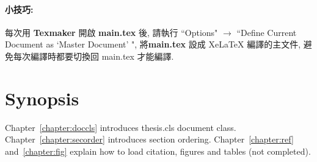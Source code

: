 \paragraph{小技巧:} 每次用 \textbf{Texmaker} 開啟 \textbf{main.tex} 後, 請執行 ``Options" $\rightarrow$ ``Define Current Document as `Master Document' ", 將\textbf{main.tex} 設成 XeLaTeX 編譯的主文件, 避免每次編譯時都要切換回 main.tex 才能編譯.

\section{Synopsis}

Chapter~\ref{chapter:doccls} introduces thesis.cls document class.
Chapter~\ref{chapter:secorder} introduces section ordering.
Chapter~\ref{chapter:ref} and~\ref{chapter:fig} explain how to load citation, figures and tables (not completed).